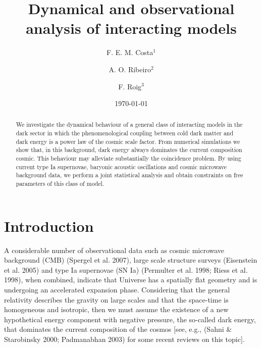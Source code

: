 \documentclass[twocolumn,preprintnumbers,amsmath,amssymb]{revtex4}
\begin{document}
\title{Dynamical and observational analysis of interacting models}

\author{F. E. M. Costa$^{1}$} 
\author{A. O. Ribeiro$^{2}$} 
\author{F. Roig$^{3}$} 


\date{\today}

\begin{abstract}

We investigate the dynamical behaviour of a general class of interacting models in the dark sector in which the 
phenomenological coupling between cold dark matter and dark energy is a power law of the cosmic scale factor. 
From numerical simulations we show that, in this background, dark energy always dominates the current composition 
cosmic. This behaviour may alleviate substantially the coincidence problem. By using current type Ia supernovae, 
baryonic acoustic oscillations and cosmic microwave background data, we perform a joint statistical analysis and 
obtain constraints on free parameters of this class of model.\\

\end{abstract}

\maketitle

\section{Introduction}


A considerable number of observational data such as cosmic microwave background (CMB) (Spergel et al. 2007), large scale structure surveys (Eisenstein et al. 2005) and type Ia supernovae (SN Ia) (Permulter et al. 1998; Riess et al. 1998), when combined, 
indicate that Universe has a spatially flat geometry and is undergoing an accelerated expansion phase. 
Considering that the general relativity describes the gravity on large scales and that the space-time is 
homogeneous and isotropic, then we must assume the existence of a new hypothetical energy component with 
negative pressure, the so-called dark energy, that dominates the current composition of the cosmos 
[see, e.g., (Sahni \& Starobinsky 2000; Padmanabhan 2003) for some recent reviews on this topic].
\end{document}
